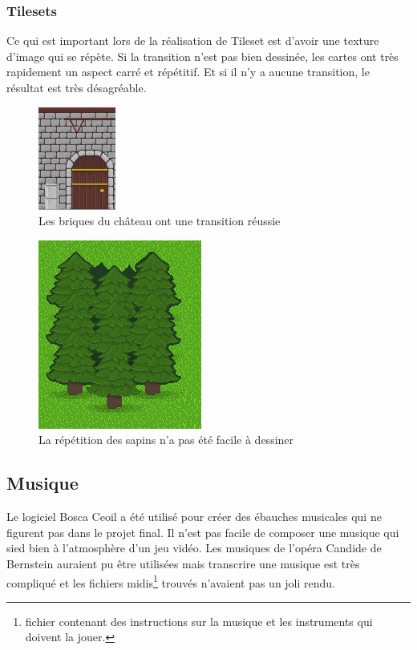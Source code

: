 \documentclass[11pt]{article}
\begin{document}
\subsubsection{Tilesets}
Ce qui est important lors de la réalisation de Tileset est d'avoir une texture d'image qui se répète. Si la transition n'est pas bien dessinée, les cartes ont très rapidement un aspect carré et répétitif. Et si il n'y a aucune transition, le résultat est très désagréable.
\begin{figure}[H]
\includegraphics{chateauTset}
\centering
\caption{Les briques du château ont une transition réussie}
\end{figure}
\begin{figure}[H]
\includegraphics{terrain1}
\centering
\caption{La répétition des sapins n'a pas été facile à dessiner}
\end{figure}
\subsection{Musique}
Le logiciel Bosca Ceoil a été utilisé pour créer des ébauches musicales qui ne figurent pas dans le projet final. Il n'est pas facile de composer une musique qui sied bien à l'atmosphère d'un jeu vidéo. Les musiques de l'opéra Candide de Bernstein auraient pu être utilisées mais transcrire une musique est très compliqué et les fichiers midis\footnote{fichier contenant des instructions sur la musique et les instruments qui doivent la jouer.} trouvés n'avaient pas un joli rendu.\\
\end{document}
